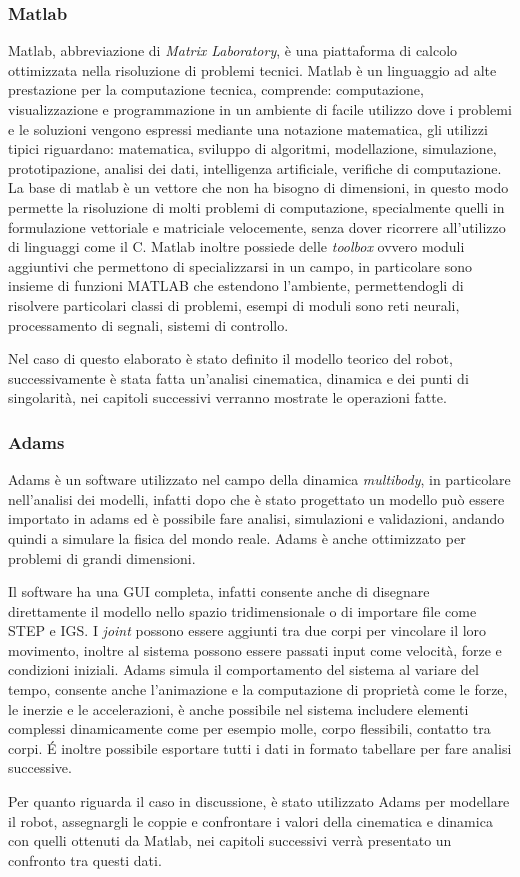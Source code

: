 \subsubsection{Matlab}
Matlab, abbreviazione di \textit{Matrix Laboratory}, è una piattaforma di calcolo ottimizzata nella risoluzione di problemi tecnici. 
Matlab è un linguaggio ad alte prestazione per la computazione tecnica, comprende: computazione, visualizzazione e programmazione in un ambiente di facile utilizzo dove i problemi e le soluzioni vengono espressi mediante una notazione matematica, gli utilizzi tipici riguardano: matematica, sviluppo di algoritmi, modellazione, simulazione, prototipazione, analisi dei dati, intelligenza artificiale, verifiche di computazione. La base di matlab è un vettore che non ha bisogno di dimensioni, in questo modo permette la risoluzione di molti problemi di computazione, specialmente quelli in formulazione vettoriale e matriciale velocemente, senza dover ricorrere all'utilizzo di linguaggi come il C. Matlab inoltre possiede delle \textit{toolbox} ovvero moduli aggiuntivi che permettono di specializzarsi in un campo, in particolare sono insieme di funzioni MATLAB che estendono l'ambiente, permettendogli di risolvere particolari classi di problemi, esempi di moduli sono reti neurali, processamento di segnali, sistemi di controllo.
\par Nel caso di questo elaborato è stato definito il modello teorico del robot, successivamente è stata fatta un'analisi cinematica, dinamica e dei punti di singolarità, nei capitoli successivi verranno mostrate le operazioni fatte. 
\subsubsection{Adams}
Adams è un software utilizzato nel campo della dinamica \textit{multibody}, in particolare nell'analisi dei modelli, infatti dopo che è stato progettato un modello può essere importato in adams ed è possibile fare analisi, simulazioni e validazioni, andando quindi a simulare la fisica del mondo reale. Adams è anche ottimizzato per problemi di grandi dimensioni.
\par Il software ha una GUI completa, infatti consente anche di disegnare direttamente il modello nello spazio tridimensionale o di importare file come STEP e IGS. I \textit{joint} possono essere aggiunti tra due corpi per vincolare il loro movimento, inoltre al sistema possono essere passati input come velocità, forze e condizioni iniziali. Adams simula il comportamento del sistema al variare del tempo, consente anche l'animazione e la computazione di proprietà come le forze, le inerzie e le accelerazioni, è anche possibile nel sistema includere elementi complessi dinamicamente come per esempio molle, corpo flessibili, contatto tra corpi.
É inoltre possibile esportare tutti i dati in formato tabellare per fare analisi successive. 
\par Per quanto riguarda il caso in discussione, è stato utilizzato Adams per modellare il robot, assegnargli le coppie e confrontare i valori della cinematica e dinamica con quelli ottenuti da Matlab, nei capitoli successivi verrà presentato un confronto tra questi dati.